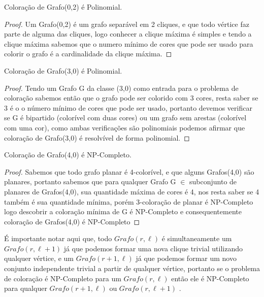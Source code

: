 	\begin{teorema}
		Coloração de Grafo(0,2) é Polinomial.
	\end{teorema}
	\begin{proof}
		Um Grafo(0,2) é um grafo separável em 2 cliques, e que todo vértice faz parte de alguma das cliques, logo conhecer a clique máxima é simples e tendo a clique máxima sabemos que o numero mínimo de cores que pode ser usado para colorir o grafo é a cardinalidade da clique máxima.
	\end{proof}

	\begin{teorema}
		Coloração de Grafo(3,0) é Polinomial.
	\end{teorema}
	\begin{proof}
		Tendo um Grafo G da classe (3,0) como entrada para o problema de coloração sabemos então que o grafo pode ser colorido com 3 cores, resta saber se 3 é o o número mínimo de cores que pode ser usado, portanto devemos verificar se G é bipartido (colorível com duas cores) ou um grafo sem arestas (colorível com uma cor), como ambas verificações são polinomiais podemos afirmar que coloração de Grafo(3,0) é resolvível de forma polinomial.
	\end{proof}

	\begin{teorema}
		Coloração de Grafo(4,0) é NP-Completo.
	\end{teorema}
	\begin{proof}
		Sabemos que todo grafo planar é 4-colorível, e que alguns Grafos(4,0) são planares, portanto sabemos que para qualquer Grafo G $\in$ subconjunto de planares de Grafos(4,0), sua quantidade máxima de cores é 4, nos resta saber se 4 também é sua quantidade mínima, porém 3-coloração de planar é NP-Completo logo descobrir a coloração mínima de G é NP-Completo e consequentemente coloração de Grafos(4,0) é NP-Completo
	\end{proof}

É importante notar aqui que, todo $Grafo(r,\ell)$ é simultaneamente um $Grafo(r,\ell+1)$ já que podemos formar uma nova clique trivial utilizando qualquer vértice, e um $Grafo(r+1,\ell)$ já que podemos formar um novo conjunto independente trivial a partir de qualquer vértice, portanto se o problema de coloração é NP-Completo para um $Grafo(r,\ell)$ então ele é NP-Completo para qualquer $Grafo(r+1,\ell)$ ou $Grafo(r,\ell+1)$ .

